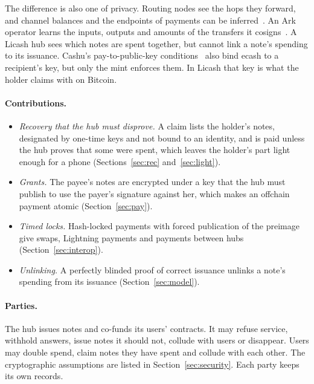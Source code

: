 \documentclass[11pt]{article}
\makeatletter
\renewcommand\section{\@startsection{section}{1}{\z@}{-2.5ex plus -1ex minus -.2ex}{1.2ex plus .2ex}{\large\bfseries}}
\makeatother
\begin{document}
The difference is also one of privacy. Routing nodes see the hops they forward, and channel balances and the endpoints of payments can be inferred~\cite{kappos}. An Ark operator learns the inputs, outputs and amounts of the transfers it cosigns~\cite{arkformal}. A Licash hub sees which notes are spent together, but cannot link a note's spending to its issuance. Cashu's pay-to-public-key conditions~\cite{nut11} also bind ecash to a recipient's key, but only the mint enforces them. In Licash that key is what the holder claims with on Bitcoin.

\paragraph{Contributions.}
\begin{itemize}[leftmargin=1.5em, itemsep=0pt]
\item \emph{Recovery that the hub must disprove.} A claim lists the holder's notes, designated by one-time keys and not bound to an identity, and is paid unless the hub proves that some were spent, which leaves the holder's part light enough for a phone (Sections~\ref{sec:rec} and~\ref{sec:light}).
\item \emph{Grants.} The payee's notes are encrypted under a key that the hub must publish to use the payer's signature against her, which makes an offchain payment atomic (Section~\ref{sec:pay}).
\item \emph{Timed locks.} Hash-locked payments with forced publication of the preimage give swaps, Lightning payments and payments between hubs (Section~\ref{sec:interop}).
\item \emph{Unlinking.} A perfectly blinded proof of correct issuance unlinks a note's spending from its issuance (Section~\ref{sec:model}).
\end{itemize}

\section{Model}
\label{sec:model}

\paragraph{Parties.} The hub issues notes and co-funds its users' contracts. It may refuse service, withhold answers, issue notes it should not, collude with users or disappear. Users may double spend, claim notes they have spent and collude with each other. The cryptographic assumptions are listed in Section~\ref{sec:security}. Each party keeps its own records.
\end{document}
